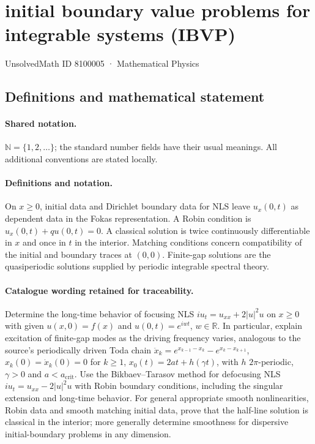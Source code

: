 \documentclass[11pt]{article}
\begin{document}
\setcounter{section}{8100004}
\section{initial boundary value problems for integrable systems (IBVP)}\label{8100005}
{\small UnsolvedMath ID 8100005 · Mathematical Physics}
\subsection{Definitions and mathematical statement}

\paragraph{Shared notation.}$\mathbb N=\{1,2,\ldots\}$; the standard number fields have their usual meanings. All additional conventions are stated locally.


\paragraph{Definitions and notation.}On $x\ge0$, initial data and Dirichlet boundary data for NLS leave $u_x(0,t)$ as dependent data in the Fokas representation. A Robin condition is $u_x(0,t)+qu(0,t)=0$. A classical solution is twice continuously differentiable in $x$ and once in $t$ in the interior. Matching conditions concern compatibility of the initial and boundary traces at $(0,0)$. Finite-gap solutions are the quasiperiodic solutions supplied by periodic integrable spectral theory.

\paragraph{Catalogue wording retained for traceability.}
Determine the long-time behavior of focusing NLS $iu_t=u_{xx}+2|u|^2u$ on $x\ge0$ with given $u(x,0)=f(x)$ and $u(0,t)=e^{iwt}$, $w\in\mathbb R$. In particular, explain excitation of finite-gap modes as the driving frequency varies, analogous to the source’s periodically driven Toda chain $\ddot x_k=e^{x_{k-1}-x_k}-e^{x_k-x_{k+1}}$, $x_k(0)=\dot x_k(0)=0$ for $k\ge1$, $x_0(t)=2at+h(\gamma t)$, with $h$ $2\pi$-periodic, $\gamma>0$ and $a<a_{\mathrm{crit}}$. Use the Bikbaev--Tarasov method for defocusing NLS $iu_t=u_{xx}-2|u|^2u$ with Robin boundary conditions, including the singular extension and long-time behavior. For general appropriate smooth nonlinearities, Robin data and smooth matching initial data, prove that the half-line solution is classical in the interior; more generally determine smoothness for dispersive initial-boundary problems in any dimension.
\end{document}
